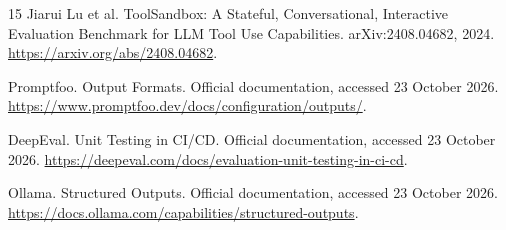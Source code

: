 \documentclass[10pt,twocolumn,letterpaper]{article}
\begin{document}
{\begin{thebibliography}{15}
Jiarui Lu et al.
ToolSandbox: A Stateful, Conversational, Interactive Evaluation Benchmark
for LLM Tool Use Capabilities. arXiv:2408.04682, 2024.
\url{https://arxiv.org/abs/2408.04682}.

Promptfoo. Output Formats. Official documentation, accessed 23 October 2026.
\url{https://www.promptfoo.dev/docs/configuration/outputs/}.

DeepEval. Unit Testing in CI/CD. Official documentation, accessed 23 October 2026.
\url{https://deepeval.com/docs/evaluation-unit-testing-in-ci-cd}.

Ollama. Structured Outputs. Official documentation, accessed 23 October 2026.
\url{https://docs.ollama.com/capabilities/structured-outputs}.
\end{thebibliography}
}
\end{document}
